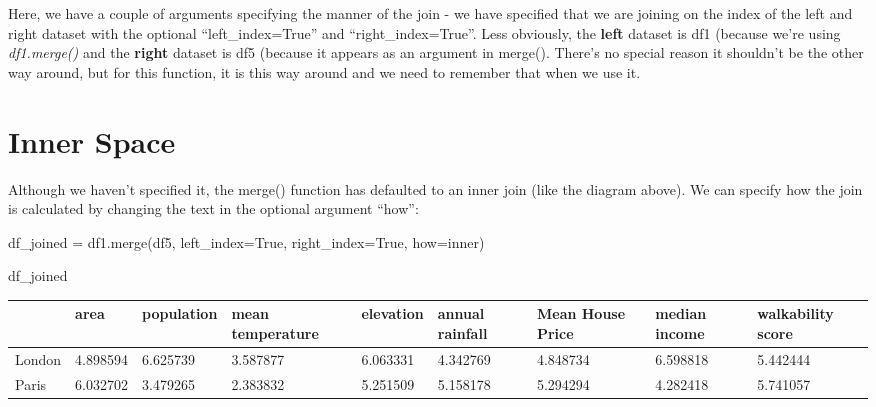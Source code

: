 \documentclass[
  letterpaper,
  DIV=11,
  numbers=noendperiod]{scrreprt}
\newenvironment{Shaded}{\begin{snugshade}}{\end{snugshade}}
\newcommand{\NormalTok}[1]{\textcolor[rgb]{0.00,0.23,0.31}{#1}}
\newcommand{\OperatorTok}[1]{\textcolor[rgb]{0.37,0.37,0.37}{#1}}
\newcommand{\StringTok}[1]{\textcolor[rgb]{0.13,0.47,0.30}{#1}}
\newcommand{\VariableTok}[1]{\textcolor[rgb]{0.07,0.07,0.07}{#1}}
\begin{document}
Here, we have a couple of arguments specifying the manner of the join -
we have specified that we are joining on the index of the left and right
dataset with the optional ``left\_index=True'' and
``right\_index=True''. Less obviously, the \textbf{left} dataset is df1
(because we're using \emph{df1.merge()} and the \textbf{right} dataset
is df5 (because it appears as an argument in merge(). There's no special
reason it shouldn't be the other way around, but for this function, it
is this way around and we need to remember that when we use it.

\hypertarget{inner-space}{%
\section{Inner Space}\label{inner-space}}

Although we haven't specified it, the merge() function has defaulted to
an inner join (like the diagram above). We can specify how the join is
calculated by changing the text in the optional argument ``how'':

\begin{Shaded}
\begin{Highlighting}[]
\NormalTok{df\_joined }\OperatorTok{=}\NormalTok{ df1.merge(df5, left\_index}\OperatorTok{=}\VariableTok{True}\NormalTok{, right\_index}\OperatorTok{=}\VariableTok{True}\NormalTok{, how}\OperatorTok{=}\StringTok{\textquotesingle{}inner\textquotesingle{}}\NormalTok{)}
\end{Highlighting}
\end{Shaded}

\begin{Shaded}
\begin{Highlighting}[]
\NormalTok{df\_joined}
\end{Highlighting}
\end{Shaded}

\begin{longtable}[]{@{}lllllllll@{}}
\toprule\noalign{}
& area & population & mean temperature & elevation & annual rainfall &
Mean House Price & median income & walkability score \\
\midrule\noalign{}
\endhead
\bottomrule\noalign{}
\endlastfoot
London & 4.898594 & 6.625739 & 3.587877 & 6.063331 & 4.342769 & 4.848734
& 6.598818 & 5.442444 \\
Paris & 6.032702 & 3.479265 & 2.383832 & 5.251509 & 5.158178 & 5.294294
& 4.282418 & 5.741057 \\
\end{longtable}
\end{document}
